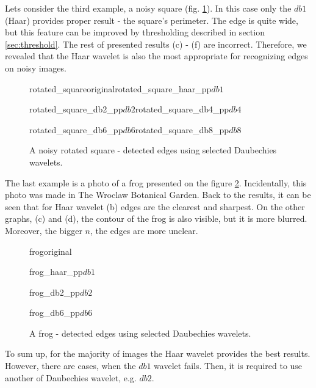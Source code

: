 Lets consider the third example, a noisy square (fig. \ref{fig:rotated_square_daubechies}). In this case only the $db1$ (Haar) provides proper result - the square's perimeter. The edge is quite wide, but this feature can be improved by thresholding described in section \ref{sec:threshold}. The rest of presented results (c) - (f) are incorrect. Therefore, we revealed that the Haar wavelet is also the most appropriate for recognizing edges on noisy images. 

\begin{figure}[h]
	\centering
	\begin{subdiagrams2}{rotated_square}{original}{rotated_square_haar_pp}{$db1$}
	\end{subdiagrams2}

	\begin{subdiagrams2}{rotated_square_db2_pp}{$db2$}{rotated_square_db4_pp}{$db4$}
	\end{subdiagrams2}
	
	\begin{subdiagrams2}{rotated_square_db6_pp}{$db6$}{rotated_square_db8_pp}{$db8$}
	\end{subdiagrams2}
	
	\caption{A noisy rotated square - detected edges using selected Daubechies wavelets.}
	\label{fig:rotated_square_daubechies}
\end{figure}

The last example is a photo of a frog presented on the figure \ref{fig:frog_daubechies}. Incidentally, this photo was made in The Wroclaw Botanical Garden. Back to the results, it can be seen that for Haar wavelet (b) edges are the clearest and sharpest. On the other graphs, (c) and (d), the contour of the frog is also visible, but it is more blurred. Moreover, the bigger $n$, the edges are more unclear.

\begin{figure}[h]
	\centering
	\begin{subdiagram}{frog}{original}
	\end{subdiagram}

	\begin{subdiagram}{frog_haar_pp}{$db1$}
	\end{subdiagram}
	
	\begin{subdiagram}{frog_db2_pp}{$db2$}
	\end{subdiagram}

	\begin{subdiagram}{frog_db6_pp}{$db6$}
	\end{subdiagram}
	
	\caption{A frog - detected edges using selected Daubechies wavelets.}
	\label{fig:frog_daubechies}
\end{figure}

To sum up, for the majority of images the Haar wavelet provides the best results. However, there are cases, when the $db1$ wavelet fails. Then, it is required to use another of Daubechies wavelet, e.g. $db2$.

